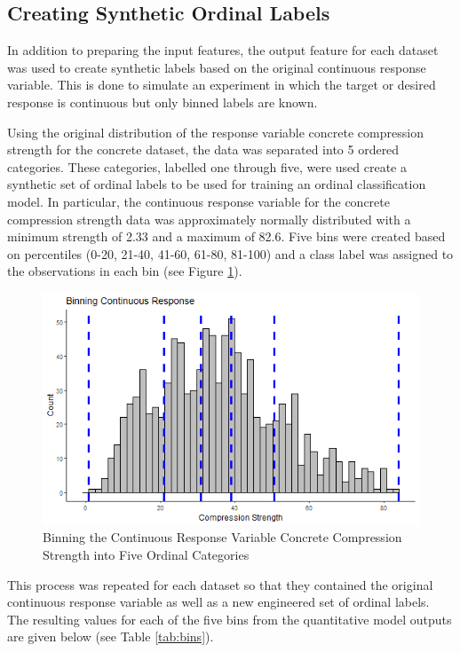 \documentclass[10pt]{article}\usepackage[]{graphicx}\usepackage[]{xcolor}
\begin{document}
\subsection{Creating Synthetic Ordinal Labels}
In addition to preparing the input features, the output feature for each dataset was used to create synthetic labels based on the original continuous response variable. This is done to simulate an experiment in which the target or desired response is continuous but only binned labels are known. 

Using the original distribution of the response variable concrete compression strength for the concrete dataset, the data was separated into 5 ordered categories. These categories, labelled one through five, were used create a synthetic set of ordinal labels to be used for training an ordinal classification model. In particular, the continuous response variable for the concrete compression strength data was approximately normally distributed with a minimum strength of 2.33 and a maximum of 82.6. Five bins were created based on percentiles (0-20, 21-40, 41-60, 61-80, 81-100) and a class label was assigned to the observations in each bin (see Figure \ref{img:binning_example}).

\begin{figure}[htp]
  \centering
  \includegraphics[scale=0.8]{EDA/binning_example.png}
  \caption{Binning the Continuous Response Variable Concrete Compression Strength into Five Ordinal Categories}
  \label{img:binning_example}
\end{figure}

This process was repeated for each dataset so that they contained the original continuous response variable as well as a new engineered set of ordinal labels. The resulting values for each of the five bins from the quantitative model outputs are given below (see Table \ref{tab:bins}).
\end{document}

